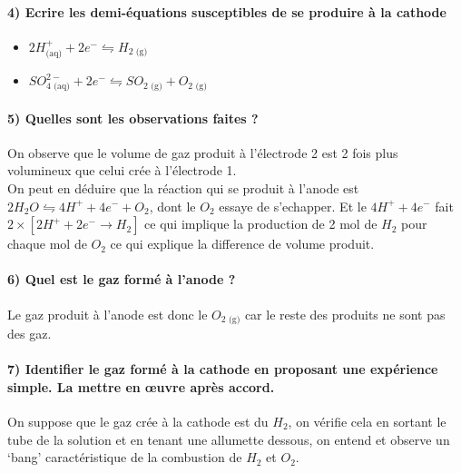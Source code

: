 \documentclass[a4paper, 12pt]{scrartcl}
\begin{document}
\paragraph*{4) Ecrire les demi-équations susceptibles de se produire à la cathode \\[5mm]}

\begin{itemize}
    \item[\textbullet] $2H^+_{\text{(aq)}} + 2e^- \leftrightharpoons H_{2\text{ (g)}}$ \\[2mm]
    \item[\textbullet] $SO^{2-}_{4\text{ (aq)}} + 2e^-\leftrightharpoons SO_{2\text{ (g)}} + O_{2\text{ (g)}}$ \\[2mm]
\end{itemize}

\paragraph*{5) Quelles sont les observations faites ? \\[5mm]}

On observe que le volume de gaz produit à l'électrode 2 est 2 fois plus volumineux que celui crée à l'électrode 1. \\
On peut en déduire que la réaction qui se produit à l'anode est $2H_2O \leftrightharpoons 4H^+ + 4e^- + O_2$, dont le $O_2$ essaye de s'echapper. 
Et le $4H^+ + 4e^-$ fait $2\times \left[ 2H^+ +2e^- \longrightarrow H_2 \right]$ ce qui implique la production de 2 mol de $H_2$ pour chaque mol de $O_2$ 
ce qui explique la difference de volume produit. 

\paragraph*{6) Quel est le gaz formé à l'anode ? \\[5mm]}

Le gaz produit à l'anode est donc le $O_{2 \text{ (g)}}$ car le reste des produits ne sont pas des gaz.

\paragraph*{7) Identifier le gaz formé à la cathode en proposant une expérience simple. La mettre en œuvre après accord. \\[5mm]}

On suppose que le gaz crée à la cathode est du $H_2$, on vérifie cela en sortant le tube de la solution et en tenant une allumette dessous, 
on entend et observe un `bang' caractéristique de la combustion de $H_2$ et $O_2$.
\end{document}
